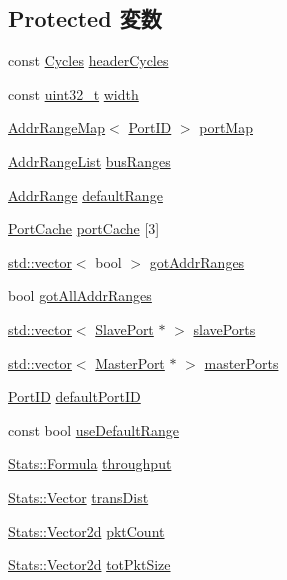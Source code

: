 \subsection*{Protected 変数}
\begin{DoxyCompactItemize}
\item 
const \hyperlink{classCycles}{Cycles} \hyperlink{classBaseBus_ab9c87c91aa592a3542152117cdb99c9b}{headerCycles}
\item 
const \hyperlink{Type_8hh_a435d1572bf3f880d55459d9805097f62}{uint32\_\-t} \hyperlink{classBaseBus_a4c2292bdfd51cf112bcde1ad3fa55ac4}{width}
\item 
\hyperlink{classAddrRangeMap}{AddrRangeMap}$<$ \hyperlink{base_2types_8hh_acef4d7d41cb21fdc252e20c04cd7bb8e}{PortID} $>$ \hyperlink{classBaseBus_a81c901d8c13bd997dee7a12453bb29e9}{portMap}
\item 
\hyperlink{classstd_1_1list}{AddrRangeList} \hyperlink{classBaseBus_ae980bda7663fbe15e79dd75a91d8448c}{busRanges}
\item 
\hyperlink{classAddrRange}{AddrRange} \hyperlink{classBaseBus_aacb632304c6d3351600303116de8870d}{defaultRange}
\item 
\hyperlink{structBaseBus_1_1PortCache}{PortCache} \hyperlink{classBaseBus_ab8fed472717f8738191c2977c81e530b}{portCache} \mbox{[}3\mbox{]}
\item 
\hyperlink{classstd_1_1vector}{std::vector}$<$ bool $>$ \hyperlink{classBaseBus_ace0f90dcdbf1c53391c0971acc0269ec}{gotAddrRanges}
\item 
bool \hyperlink{classBaseBus_a0c924502f5e6c095ac7dcbdaf3e177a4}{gotAllAddrRanges}
\item 
\hyperlink{classstd_1_1vector}{std::vector}$<$ \hyperlink{classSlavePort}{SlavePort} $\ast$ $>$ \hyperlink{classBaseBus_a9f084bf86a306772d84ad52e839cce97}{slavePorts}
\item 
\hyperlink{classstd_1_1vector}{std::vector}$<$ \hyperlink{classMasterPort}{MasterPort} $\ast$ $>$ \hyperlink{classBaseBus_a0f7b2e1619b03085b0a28bb3216cd562}{masterPorts}
\item 
\hyperlink{base_2types_8hh_acef4d7d41cb21fdc252e20c04cd7bb8e}{PortID} \hyperlink{classBaseBus_a769e7b27ddafebcc1228757f2c9ec1ba}{defaultPortID}
\item 
const bool \hyperlink{classBaseBus_a1b0312e896847e0ef8bbad93fa73dc4c}{useDefaultRange}
\item 
\hyperlink{classStats_1_1Formula}{Stats::Formula} \hyperlink{classBaseBus_ac7ddaff47c2ff8945ba85797af602673}{throughput}
\item 
\hyperlink{classStats_1_1Vector}{Stats::Vector} \hyperlink{classBaseBus_a3eb88cd36449bb56229422858d34194d}{transDist}
\item 
\hyperlink{classStats_1_1Vector2d}{Stats::Vector2d} \hyperlink{classBaseBus_a1444e1d672a8bfe518b9c3d05412985a}{pktCount}
\item 
\hyperlink{classStats_1_1Vector2d}{Stats::Vector2d} \hyperlink{classBaseBus_a1b2222f1cfbd8c191ad8d1099fd24848}{totPktSize}
\end{DoxyCompactItemize}


